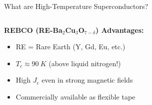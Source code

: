 \documentclass[aspectratio=169,xcolor={table,dvipsnames}]{beamer}
\newcommand{\Kelvin}[1]{#1~K}
\newcommand{\Jc}{J_\text{c}}
\begin{document}
\begin{frame}{What are High-Temperature Superconductors?}
\begin{columns}
\begin{column}{0.6\textwidth}
            \vspace{0.3cm}
            \textbf{REBCO (RE-Ba$_2$Cu$_3$O$_{7-\delta}$) Advantages:}
            \begin{itemize}
                \item RE = Rare Earth (Y, Gd, Eu, etc.)
                \item $T_c \approx \Kelvin{90}$ (above liquid nitrogen!)
                \item High $\Jc$ even in strong magnetic fields
                \item Commercially available as flexible tape
            \end{itemize}
        \end{column}
        \begin{column}{0.4\textwidth}
            \centering
        \end{column}
    \end{columns}
\end{frame}
\end{document}
